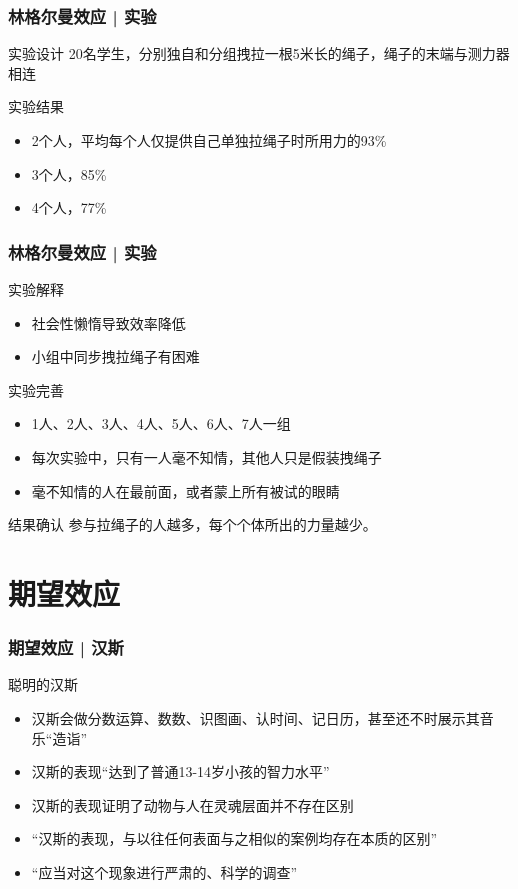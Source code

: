 \begin{frame}
  \frametitle{林格尔曼效应 | 实验}
  \begin{block}{实验设计}
      20名学生，分别独自和分组拽拉一根5米长的绳子，绳子的末端与测力器相连
  \end{block}
  \pause
  \begin{block}{实验结果}
    \begin{itemize}
      \item 2个人，平均每个人仅提供自己单独拉绳子时所用力的93\%
      \item 3个人，85\%
      \item 4个人，77\%
    \end{itemize}
  \end{block}
\end{frame}

\begin{frame}
  \frametitle{林格尔曼效应 | 实验}
  \begin{block}{实验解释}
    \begin{itemize}
      \item 社会性懒惰导致效率降低
      \item 小组中同步拽拉绳子有困难
    \end{itemize}
  \end{block}
  \pause
  \begin{block}{实验完善}
    \begin{itemize}
      \item 1人、2人、3人、4人、5人、6人、7人一组
      \item 每次实验中，只有一人毫不知情，其他人只是假装拽绳子
      \item 毫不知情的人在最前面，或者蒙上所有被试的眼睛
    \end{itemize}
  \end{block}
  \pause
  \begin{block}{结果确认}
    参与拉绳子的人越多，每个个体所出的力量越少。
  \end{block}
\end{frame}

\section{期望效应}
\begin{frame}
  \frametitle{期望效应 | 汉斯}
  \begin{block}{聪明的汉斯}
    \begin{itemize}
      \item 汉斯会做分数运算、数数、识图画、认时间、记日历，甚至还不时展示其音乐“造诣”
      \item 汉斯的表现“达到了普通13-14岁小孩的智力水平”
      \item 汉斯的表现证明了动物与人在灵魂层面并不存在区别
      \item “汉斯的表现，与以往任何表面与之相似的案例均存在本质的区别”
      \item “应当对这个现象进行严肃的、科学的调查”
    \end{itemize}
  \end{block}
\end{frame}

